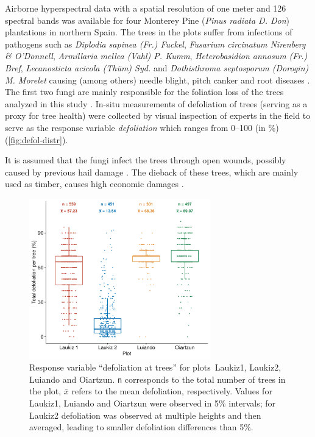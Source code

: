 \documentclass[remotesensing,article,submit,moreauthors,pdftex]{Definitions/mdpi}
\begin{document}
Airborne hyperspectral data with a spatial resolution of one meter and 126 spectral bands was available for four Monterey Pine (\textit{Pinus radiata D. Don}) plantations in northern Spain.
The trees in the plots suffer from infections of pathogens such as \textit{Diplodia sapinea (Fr.) Fuckel}, \textit{Fusarium circinatum Nirenberg \& O'Donnell}, \textit{Armillaria mellea (Vahl) P. Kumm}, \textit{Heterobasidion annosum (Fr.) Bref}, \textit{Lecanosticta acicola (Thüm) Syd.} and \textit{Dothisthroma septosporum (Dorogin) M. Morelet} causing (among others) needle blight, pitch canker and root diseases \cite{mesanza2016, iturritxa2017}.
The first two fungi are mainly responsible for the foliation loss of the trees analyzed in this study \cite{iturritxa2014}.
In-situ measurements of defoliation of trees (serving as a proxy for tree health) were collected by visual inspection of experts in the field to serve as the response variable \textit{defoliation} which ranges from 0--100 (in \%) (\autoref{fig:defol-distr}).

It is assumed that the fungi infect the trees through open wounds, possibly caused by previous hail damage \cite{iturritxa2014}.
The dieback of these trees, which are mainly used as timber, causes high economic damages \cite{ganley2009}.

\begin{figure} [t!]
	\centering
	\begin{center}
		\includegraphics[width=0.7\textwidth] {defoliation-distribution-plot-1.pdf}
		\caption{Response variable ``defoliation at trees'' for plots~Laukiz1, Laukiz2, Luiando and Oiartzun. \texttt{n} corresponds to the total number of trees in the plot, $\bar{x}$ refers to the mean defoliation, respectively. Values for Laukiz1, Luiando and Oiartzun were observed in 5\% intervals; for Laukiz2 defoliation was observed at multiple heights and then averaged, leading to smaller defoliation differences than 5\%.}\label{fig:defol-distr}
	\end{center}
\end{figure}
\end{document}
